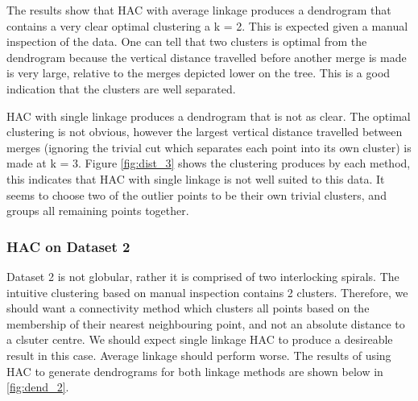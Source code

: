 \documentclass[12pt]{article}
\begin{document}
The results show that HAC with average linkage produces a dendrogram that contains
a very clear optimal clustering a k = 2. This is expected given a manual inspection
of the data. One can tell that two clusters is optimal from the dendrogram because
the vertical distance travelled before another merge is made is very large, relative
to the merges depicted lower on the tree. This is a good indication that the
clusters are well separated.

HAC with single linkage produces a dendrogram that is not as clear. The optimal
clustering is not obvious, however the largest vertical distance travelled between
merges (ignoring the trivial cut which separates each point into its own cluster)
is made at k = 3. Figure \ref{fig:dist_3} shows the clustering produces by each method,
this indicates that HAC with single linkage is not well suited to this data. It
seems to choose two of the outlier points to be their own trivial clusters, and groups
all remaining points together.

\subsubsection{HAC on Dataset 2}

Dataset 2 is not globular, rather it is comprised of two interlocking spirals. 
The intuitive clustering based on manual inspection contains 2 clusters. Therefore,
we should want a connectivity method which clusters all points based on the membership
of their nearest neighbouring point, and not an absolute distance to a clsuter centre.
We should expect single linkage HAC to produce a desireable result in this case. 
Average linkage should perform worse. The results of using HAC to generate dendrograms
for both linkage methods are shown below in \ref{fig:dend_2}.
\end{document}
